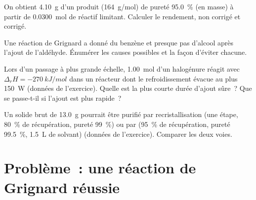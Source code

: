 \begin{exercise}[$\star\star$]\label{exo:b2:lab-techniques-2:9}
On obtient \qty{4.10}{g} d'un produit (\qty{164}{g/mol}) de pureté 95.0~\% (en masse) à partir de
\qty{0.0300}{mol} de réactif limitant. Calculer le rendement, non corrigé et corrigé.
\end{exercise}

\begin{exercise}[$\star\star\star$]\label{exo:b2:lab-techniques-2:10}
Une réaction de Grignard a donné du benzène et presque pas d'alcool après l'ajout de l'aldéhyde. Énumérer
les causes possibles et la façon d'éviter chacune.
\end{exercise}

\begin{exercise}[$\star\star\star$]\label{exo:b2:lab-techniques-2:11}
Lors d'un passage à plus grande échelle, \qty{1.00}{mol} d'un halogénure réagit avec $\Delta_rH = \qty{-270}{kJ/mol}$ dans un
réacteur dont le refroidissement évacue au plus \qty{150}{W} (données de l'exercice). Quelle est la plus
courte durée d'ajout sûre~? Que se passe-t-il si l'ajout est plus rapide~?
\end{exercise}

\begin{exercise}[$\star\star\star$]\label{exo:b2:lab-techniques-2:12}
Un solide brut de \qty{13.0}{g} pourrait être purifié par recristallisation (une étape, 80~\% de
récupération, pureté 99~\%) ou par  (95~\% de récupération, pureté 99.5~\%,
\qty{1.5}{L} de solvant) (données de l'exercice). Comparer les deux voies.
\end{exercise}

\section{Problème~: une réaction de Grignard réussie}


